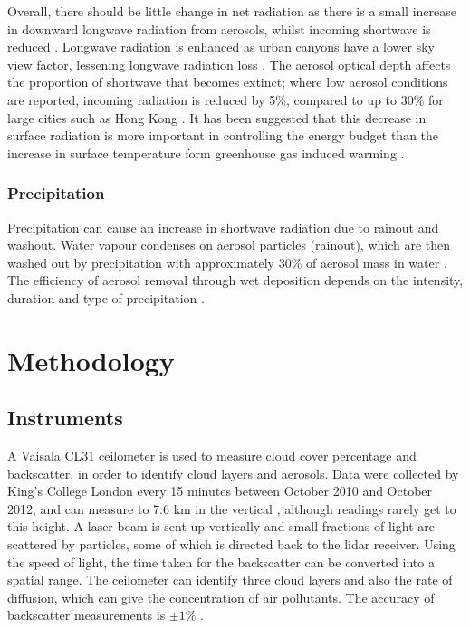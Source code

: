 \documentclass[a4paper,titlepage, twoside]{report}
\begin{document}
Overall, there should be little change in net radiation as there is a small increase in downward longwave radiation from aerosols, whilst incoming shortwave is reduced \parencite{ipcc}.  Longwave radiation is enhanced as urban canyons have a lower sky view factor, lessening longwave radiation loss \parencite{cleugh}.  The aerosol optical depth affects the proportion of shortwave that becomes extinct; where low aerosol conditions are reported, incoming radiation is reduced by 5\%, compared to up to 30\% for large cities such as Hong Kong \parencite{cleugh}.  It has been suggested that this decrease in surface radiation is more important in controlling the energy budget than the increase in surface temperature form greenhouse gas induced warming \parencite{liepert}.

\subsection{Precipitation}
Precipitation can cause an increase in shortwave radiation due to rainout and washout. Water vapour condenses on aerosol particles (rainout), which are then washed out by precipitation with approximately 30\% of aerosol mass in water \parencite{bourcier}.  The efficiency of aerosol removal through wet deposition depends on the intensity, duration and type of precipitation \parencite{van-leeuwen}.

\chapter{Methodology}
\section{Instruments}
A Vaisala CL31 ceilometer is used to measure cloud cover percentage and backscatter, in order to identify cloud layers and aerosols. Data were collected by King's College London every 15 minutes between October 2010 and October 2012, and can measure to 7.6 km in the vertical \parencite{vaisala}, although readings rarely get to this height. A laser beam is sent up vertically and small fractions of light are scattered by particles, some of which is directed back to the lidar receiver. Using the speed of light, the time taken for the backscatter can be converted into a spatial range. The ceilometer can identify three cloud layers and also the rate of diffusion, which can give the concentration of air pollutants. The accuracy of backscatter measurements is $\pm1\%$ \parencite{vaisala}.
\end{document}
